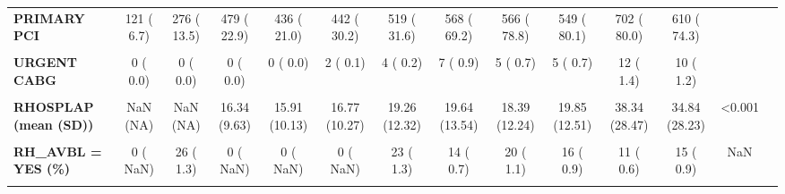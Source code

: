 \documentclass[
]{article}
\begin{document}
\begin{table}[H]
\begin{tabular}[t]{>{\raggedright\arraybackslash}p{5em}ccccccccccccc}
\textbf{PRIMARY PCI} & 121 (  6.7) & 276 ( 13.5) & 479 ( 22.9) & 436 ( 21.0) & 442 ( 30.2) & 519 ( 31.6) & 568 ( 69.2) & 566 ( 78.8) & 549 ( 80.1) & 702 ( 80.0) & 610 ( 74.3) &  & \\
\textbf{\cellcolor{gray!10}{TLX}} & \cellcolor{gray!10}{470 ( 26.2)} & \cellcolor{gray!10}{336 ( 16.4)} & \cellcolor{gray!10}{206 (  9.9)} & \cellcolor{gray!10}{137 (  6.6)} & \cellcolor{gray!10}{50 (  3.4)} & \cellcolor{gray!10}{17 (  1.0)} & \cellcolor{gray!10}{15 (  1.8)} & \cellcolor{gray!10}{15 (  2.1)} & \cellcolor{gray!10}{6 (  0.9)} & \cellcolor{gray!10}{4 (  0.5)} & \cellcolor{gray!10}{6 (  0.7)} & \cellcolor{gray!10}{} & \cellcolor{gray!10}{}\\
\textbf{URGENT CABG} & 0 (  0.0) & 0 (  0.0) & 0 (  0.0) & 0 (  0.0) & 2 (  0.1) & 4 (  0.2) & 7 (  0.9) & 5 (  0.7) & 5 (  0.7) & 12 (  1.4) & 10 (  1.2) &  & \\
\textbf{\cellcolor{gray!10}{REUAPMI = YES (\%)}} & \cellcolor{gray!10}{348 ( 19.4)} & \cellcolor{gray!10}{256 ( 12.5)} & \cellcolor{gray!10}{175 (  8.4)} & \cellcolor{gray!10}{217 ( 10.5)} & \cellcolor{gray!10}{136 (  7.8)} & \cellcolor{gray!10}{93 (  5.2)} & \cellcolor{gray!10}{81 (  4.3)} & \cellcolor{gray!10}{53 (  3.0)} & \cellcolor{gray!10}{51 (  2.9)} & \cellcolor{gray!10}{68 (  3.9)} & \cellcolor{gray!10}{53 (  3.0)} & \cellcolor{gray!10}{<0.001} & \cellcolor{gray!10}{}\\
\textbf{RHOSPLAP (mean (SD))} & NaN (NA) & NaN (NA) & 16.34 (9.63) & 15.91 (10.13) & 16.77 (10.27) & 19.26 (12.32) & 19.64 (13.54) & 18.39 (12.24) & 19.85 (12.51) & 38.34 (28.47) & 34.84 (28.23) & <0.001 & \\
\textbf{\cellcolor{gray!10}{RH\_AFSVT = YES (\%)}} & \cellcolor{gray!10}{0 (  NaN)} & \cellcolor{gray!10}{92 (  4.5)} & \cellcolor{gray!10}{100 (  4.8)} & \cellcolor{gray!10}{0 (  NaN)} & \cellcolor{gray!10}{74 (  4.2)} & \cellcolor{gray!10}{78 (  4.4)} & \cellcolor{gray!10}{154 (  8.2)} & \cellcolor{gray!10}{102 (  5.7)} & \cellcolor{gray!10}{82 (  4.6)} & \cellcolor{gray!10}{92 (  5.3)} & \cellcolor{gray!10}{94 (  5.4)} & \cellcolor{gray!10}{NaN} & \cellcolor{gray!10}{}\\
\textbf{RH\_AVBL = YES (\%)} & 0 (  NaN) & 26 (  1.3) & 0 (  NaN) & 0 (  NaN) & 0 (  NaN) & 23 (  1.3) & 14 (  0.7) & 20 (  1.1) & 16 (  0.9) & 11 (  0.6) & 15 (  0.9) & NaN & \\
\textbf{\cellcolor{gray!10}{RH\_NSR = YES (\%)}} & \cellcolor{gray!10}{0 (  NaN)} & \cellcolor{gray!10}{1751 ( 85.5)} & \cellcolor{gray!10}{1947 ( 93.0)} & \cellcolor{gray!10}{1730 ( 83.4)} & \cellcolor{gray!10}{1606 ( 92.0)} & \cellcolor{gray!10}{1630 ( 91.6)} & \cellcolor{gray!10}{1604 ( 85.1)} & \cellcolor{gray!10}{1537 ( 85.8)} & \cellcolor{gray!10}{1573 ( 88.5)} & \cellcolor{gray!10}{1513 ( 86.5)} & \cellcolor{gray!10}{1512 ( 86.2)} & \cellcolor{gray!10}{NaN} & \cellcolor{gray!10}{}\\

\end{tabular}
\end{table}
\end{document}
